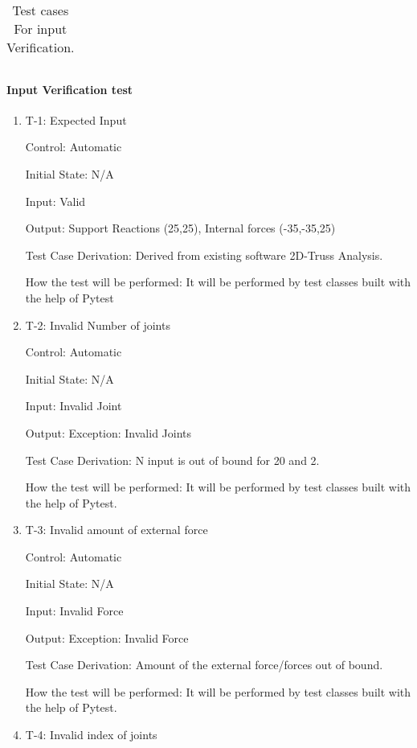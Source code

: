 \documentclass[12pt, titlepage]{article}
\begin{document}
\begin{table}
\begin{tabular}{|c|c|c|c|}
 \hline
 
 
 
\end{tabular}
\caption{\label{tbl_tc}Test cases For input Verification.}
\end{table}		
\paragraph{Input Verification test}

\begin{enumerate}

\item{T-1: Expected Input\\}

Control: Automatic
					
Initial State: N/A
					
Input: Valid
					
Output: Support Reactions (25,25), Internal forces (-35,-35,25)

Test Case Derivation: Derived from existing software 2D-Truss Analysis.
					
How the test will be performed: It will be performed by test classes built with the help of Pytest
					
\item{T-2: Invalid Number of joints \\}

Control: Automatic
					
Initial State: N/A
					
Input: Invalid Joint
					
Output: Exception: Invalid Joints

Test Case Derivation: N input is out of bound for 20 and 2.

How the test will be performed: It will be performed by test classes built with the help of Pytest.
\item{T-3: Invalid amount of external force \\}

Control: Automatic
					
Initial State: N/A
					
Input: Invalid Force
					
Output: Exception: Invalid Force

Test Case Derivation: Amount of the external force/forces out of bound. 

How the test will be performed: It will be performed by test classes built with the help of Pytest.
\item{T-4: Invalid index of joints \\}


\end{enumerate}
\end{document}

